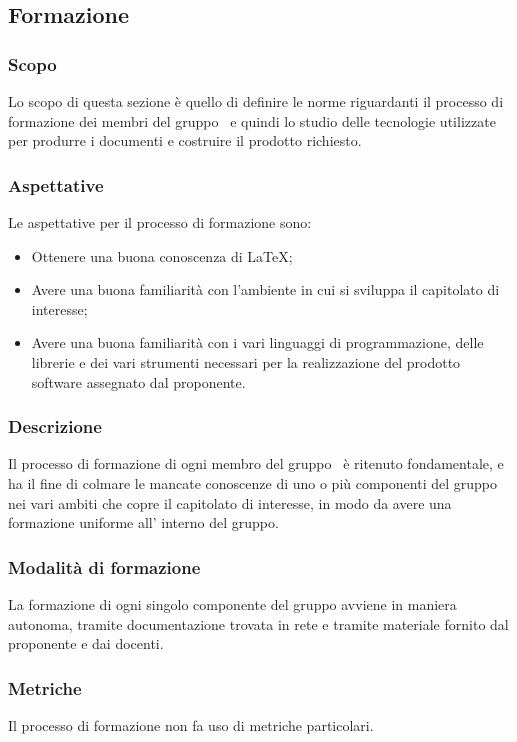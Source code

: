         \subsection{Formazione} \label{subsection: formazione}
        \subsubsection {Scopo}
        Lo scopo di questa sezione è quello di definire le norme riguardanti il processo di formazione dei membri del gruppo \groupName\ e quindi lo studio delle tecnologie utilizzate per produrre i documenti e costruire il prodotto richiesto.
        \subsubsection {Aspettative}
        Le aspettative per il processo di formazione sono:
        \begin {itemize}
          \item Ottenere una buona conoscenza di \LaTeX;
          \item Avere una buona familiarità con l'ambiente in cui si sviluppa il capitolato di interesse;
          \item Avere una buona familiarità con i vari linguaggi di programmazione, delle librerie e dei vari strumenti necessari per la realizzazione del prodotto software assegnato dal proponente.
        \end {itemize}
        \subsubsection {Descrizione}
        Il processo di formazione di ogni membro del gruppo \groupName\ è ritenuto fondamentale, e ha il fine di colmare le mancate conoscenze di uno o più componenti del gruppo nei vari ambiti che copre il capitolato di interesse, in modo da avere una formazione uniforme all' interno del gruppo.
        \subsubsection {Modalità di formazione}
        La formazione di ogni singolo componente del gruppo avviene in maniera autonoma, tramite documentazione trovata in rete e tramite materiale fornito dal proponente e dai docenti.
        \subsubsection {Metriche}
        Il processo di formazione non fa uso di metriche particolari.
